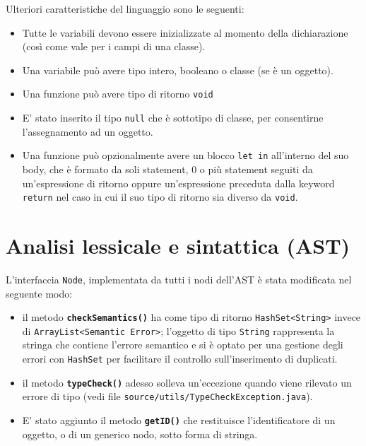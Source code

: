 \documentclass[a4paper]{article}   %
\begin{document}
Ulteriori caratteristiche del linguaggio sono le seguenti:
\begin{itemize}
  \item Tutte le variabili devono essere inizializzate al momento della dichiarazione (così come vale per i campi di una classe).
  \item Una variabile può avere tipo intero, booleano o classe (se è un oggetto).
  \item Una funzione può avere tipo di ritorno \lstinline|void|
  \item E' stato inserito il tipo \lstinline|null| che è sottotipo di classe, per consentirne l'assegnamento ad un oggetto.
  \item Una funzione può opzionalmente avere un blocco \lstinline[language=ANTLR]|let in| all'interno del suo body, che è formato da soli statement, 0 o più statement seguiti da un'espressione di ritorno oppure un'espressione preceduta dalla keyword \lstinline[language=ANTLR]|return| nel caso in cui il suo tipo di ritorno sia diverso da \lstinline|void|.
\end{itemize}

\section{Analisi lessicale e sintattica (AST)}
L'interfaccia \lstinline|Node|, implementata da tutti i nodi dell'AST è stata modificata nel seguente modo:\\
\begin{itemize}
  \item il metodo \textbf{\lstinline|checkSemantics()|} ha come tipo di ritorno \lstinline|HashSet<String>| invece di \lstinline|ArrayList<Semantic Error>|; l'oggetto di tipo \lstinline|String| rappresenta la stringa che contiene l'errore semantico e si è optato per una gestione degli errori con \lstinline|HashSet| per facilitare il controllo sull'inserimento di duplicati.
  \item il metodo \textbf{\lstinline|typeCheck()|} adesso solleva un'eccezione quando viene rilevato un errore di tipo (vedi file \lstinline|source/utils/TypeCheckException.java|).
  \item E' stato aggiunto il metodo \textbf{\lstinline|getID()|} che restituisce l'identificatore di un oggetto, o di un generico nodo, sotto forma di stringa.
\end{itemize}

\end{document}
